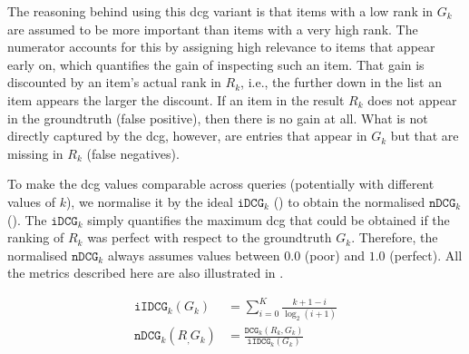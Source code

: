 The reasoning behind using this \acrshort{dcg} variant is that items with a low rank in $G_k$ are assumed to be more important than items with a very high rank. The numerator accounts for this by assigning high relevance to items that appear early on, which quantifies the gain of inspecting such an item. That gain is discounted by an item's actual rank in $R_k$, i.e., the further down in the list an item appears the larger the discount. If an item in the result $R_k$ does not appear in the groundtruth (false positive), then there is no gain at all. What is not directly captured by the \acrshort{dcg}, however, are entries that appear in $G_k$ but that are missing in $R_k$ (false negatives).

To make the \acrshort{dcg} values comparable across queries (potentially with different values of $k$), we normalise it by the ideal $\mathtt{iDCG}_k$ () to obtain the normalised $\mathtt{nDCG}_k$ (). The $\mathtt{iDCG}_k$ simply quantifies the maximum \acrshort{dcg} that could be obtained if the ranking of $R_k$ was perfect with respect to the groundtruth $G_k$. Therefore, the normalised $\mathtt{nDCG}_k$ always assumes values between $0.0$ (poor) and $1.0$ (perfect). All the metrics described here are also illustrated in .

\begin{align}
    \label{equation:idcg}
    \mathtt{iIDCG}_k(G_k) &= \sum_{i = 0}^{K} \frac{k + 1 - i}{\log_2(i + 1)} \\
    \label{equation:ndcg}
    \mathtt{nDCG}_k(R_, G_k) &= \frac{\mathtt{DCG}_k(R_k, G_k)}{\mathtt{iIDCG}_k(G_k)} 
\end{align}

